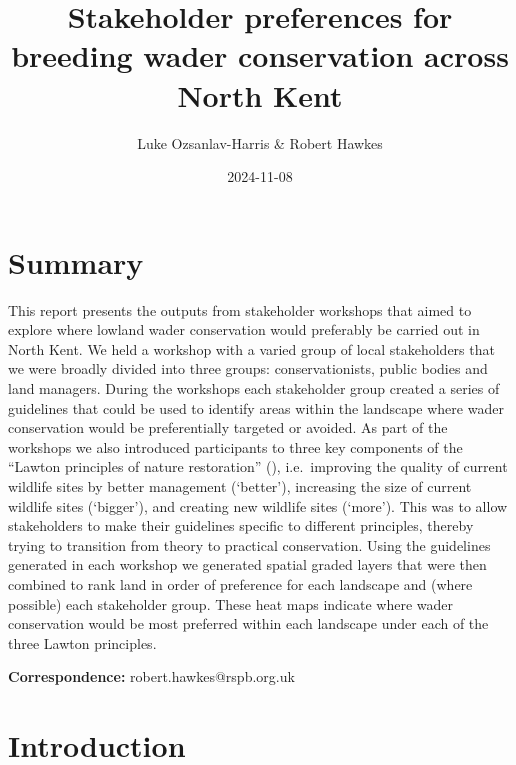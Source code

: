 \documentclass[
  12pt,
  letterpaper,
  DIV=11,
  numbers=noendperiod]{scrartcl}
\title{Stakeholder preferences for breeding wader conservation across
North Kent}
\author{Luke Ozsanlav-Harris \& Robert Hawkes}
\date{2024-11-08}
\begin{document}
\maketitle


\section{Summary}\label{summary}

This report presents the outputs from stakeholder workshops that aimed
to explore where lowland wader conservation would preferably be carried
out in North Kent. We held a workshop with a varied group of local
stakeholders that we were broadly divided into three groups:
conservationists, public bodies and land managers. During the workshops
each stakeholder group created a series of guidelines that could be used
to identify areas within the landscape where wader conservation would be
preferentially targeted or avoided. As part of the workshops we also
introduced participants to three key components of the ``Lawton
principles of nature restoration'' (), i.e.~improving the quality of current wildlife sites by
better management (`better'), increasing the size of current wildlife
sites (`bigger'), and creating new wildlife sites (`more'). This was to
allow stakeholders to make their guidelines specific to different
principles, thereby trying to transition from theory to practical
conservation. Using the guidelines generated in each workshop we
generated spatial graded layers that were then combined to rank land in
order of preference for each landscape and (where possible) each
stakeholder group. These heat maps indicate where wader conservation
would be most preferred within each landscape under each of the three
Lawton principles.

\textbf{Correspondence:} robert.hawkes@rspb.org.uk

\newpage{}

\section{Introduction}\label{introduction}
\end{document}

